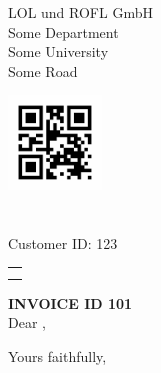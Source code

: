 \documentclass{letter}
\makeatletter
\renewcommand*{\opening}[1]{\ifx\@empty\fromaddress%
  \thispagestyle{firstpage}%
    {\raggedleft\@date\par}%
  \else%
   \thispagestyle{empty}%
   {%
    \begin{minipage}[c]{0.50\linewidth}
    \includegraphics[height=2.5cm, keepaspectratio=true]{qr.png}\\ 
    \toname \\
    \toaddress\\[0.1em]
    Customer ID: 123\\[1.1em]%
    \end{minipage}
    \begin{minipage}[c]{0.45\linewidth}
    \raggedleft\begin{tabular}{l@{}}\ignorespaces
    \fromaddress\\[2.9em]%
    \@date
    \end{tabular}
    \end{minipage}
    \par
}%
  \fi
  \vspace{2\parskip}%
  #1\par\nobreak}
\makeatother
\begin{document}
%
    \begin{letter}{%
            LOL und ROFL GmbH\\%
            Some Department\\%
            Some University\\%
            Some Road\\%
        }%
%
%       
        \opening{{\large \bf INVOICE ID 101} \\[1.0cm] Dear \toname{},}\hfil
%
             \lipsum[1-18]

        \closing{Yours faithfully,\\
         \\
        }
        
        
    \end{letter}%
\end{document}
